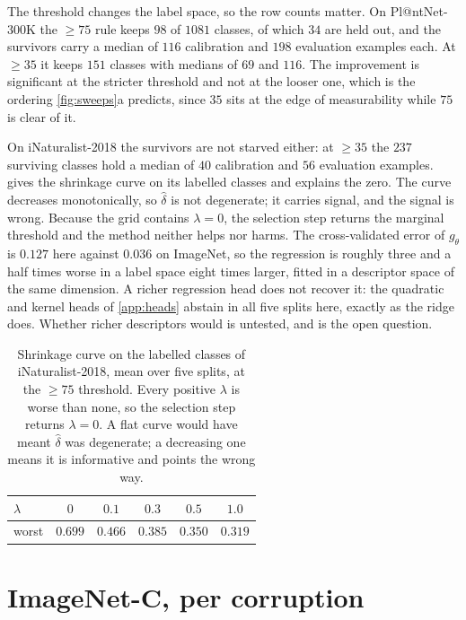 The threshold changes the label space, so the row counts matter. On Pl@ntNet-300K the
$\ge 75$ rule keeps $98$ of $1081$ classes, of which $34$ are held out, and the survivors carry
a median of $116$ calibration and $198$ evaluation examples each. At $\ge 35$ it keeps $151$
classes with medians of $69$ and $116$. The improvement is significant at the stricter threshold
and not at the looser one, which is the ordering \cref{fig:sweeps}a predicts, since $35$ sits
at the edge of measurability while $75$ is clear of it.

On iNaturalist-2018 the survivors are not starved either: at $\ge 35$ the $237$ surviving
classes hold a median of $40$ calibration and $56$ evaluation examples. 
gives the shrinkage curve on its labelled classes and explains the zero. The curve decreases
monotonically, so $\hat\delta$ is not degenerate; it carries signal, and the signal is wrong.
Because the grid contains $\lambda=0$, the selection step returns the marginal threshold and the
method neither helps nor harms. The cross-validated error of $g_\theta$ is $0.127$ here against
$0.036$ on ImageNet, so the regression is roughly three and a half times worse in a label space
eight times larger, fitted in a descriptor space of the same dimension. A richer regression
head does not recover it: the quadratic and kernel heads of \cref{app:heads} abstain in all
five splits here, exactly as the ridge does. Whether richer descriptors would is untested, and
is the open question.

\begin{table}[h]
\centering
\small
\setlength{\tabcolsep}{4pt}
\begin{tabular}{@{}lccccc@{}}
\toprule
$\lambda$ & $0$ & $0.1$ & $0.3$ & $0.5$ & $1.0$ \\
\midrule
worst & $\mathbf{0.699}$ & $0.466$ & $0.385$ & $0.350$ & $0.319$ \\
\bottomrule
\end{tabular}
\caption{Shrinkage curve on the labelled classes of iNaturalist-2018, mean over five splits, at
the $\ge 75$ threshold. Every positive $\lambda$ is worse than none, so the selection step
returns $\lambda=0$. A flat curve would have meant $\hat\delta$ was degenerate; a decreasing one
means it is informative and points the wrong way.}
\label{tab:inatcurve}
\end{table}

\section{ImageNet-C, per corruption}
\label{app:imagenetc}

